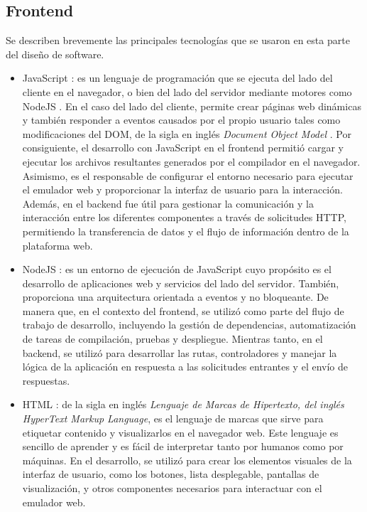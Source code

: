 \hfill \break
\hfill \break
\hfill \break
\hfill \break

\subsection{Frontend}
\label{subsec:Frontend}

Se describen brevemente las principales tecnologías que se usaron en esta parte del diseño de software.

\begin{itemize}
	\item JavaScript \citep{JavaScript}: es un lenguaje de programación que se ejecuta del lado del cliente en el navegador, o bien del lado del servidor mediante motores como NodeJS \citep{NodeJS}. En el caso del lado del cliente, permite crear páginas web dinámicas y también responder a eventos causados por el propio usuario tales como modificaciones del DOM, de la sigla en inglés  \textit{Document Object Model} \citep{DOM}. Por consiguiente, el desarrollo con JavaScript en el frontend permitió cargar y ejecutar los archivos resultantes generados por el compilador en el navegador. Asimismo, es el responsable de configurar el entorno necesario para ejecutar el emulador web y proporcionar la interfaz de usuario para la interacción. Además, en el backend fue útil para gestionar la comunicación y la interacción entre los diferentes componentes a través de solicitudes HTTP, permitiendo la transferencia de datos y el flujo de información dentro de la plataforma web.

	\item NodeJS \citep{NodeJS}: 
es un entorno de ejecución de JavaScript cuyo propósito es el desarrollo de aplicaciones web y servicios del lado del servidor. También, proporciona una arquitectura orientada a eventos y no bloqueante. 
De manera que, en el contexto del frontend, se utilizó como parte del flujo de trabajo de desarrollo, incluyendo la gestión de dependencias, automatización de tareas de compilación, pruebas y despliegue. Mientras tanto, en el backend, se utilizó para desarrollar las rutas, controladores y manejar la lógica de la aplicación en respuesta a las solicitudes entrantes y el envío de respuestas.

	\item HTML \citep{HTML}: de la sigla en inglés \textit{Lenguaje de Marcas de Hipertexto, del inglés HyperText Markup Language}, es el lenguaje de marcas que sirve para etiquetar contenido y visualizarlos en el navegador web.
	Este lenguaje es sencillo de aprender y es fácil de interpre­tar tanto por humanos como por máquinas.  En el desarrollo, se utilizó para crear los elementos visuales de la interfaz de usuario, como los botones, lista desplegable, pantallas de visualización, y otros componentes necesarios para interactuar con el emulador web.


\end{itemize}
